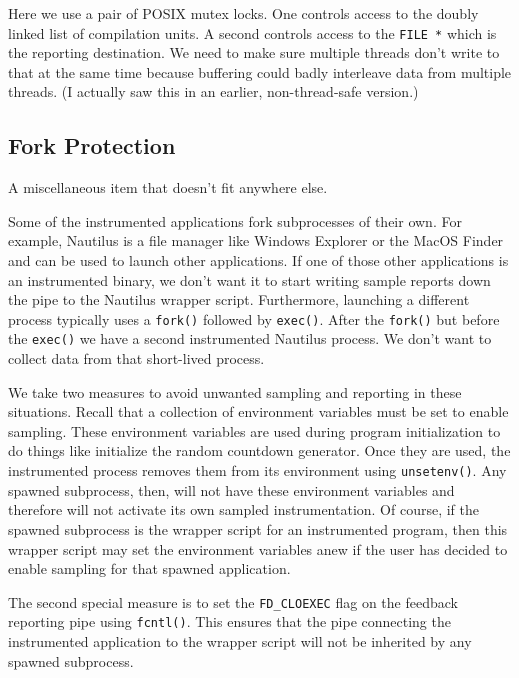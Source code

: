 \documentclass[10pt,twocolumn]{article}
\begin{document}
Here we use a pair of POSIX mutex locks.  One controls access to the
doubly linked list of compilation units.  A second controls access to
the \texttt{FILE *} which is the reporting destination.  We need to
make sure multiple threads don't write to that at the same time
because buffering could badly interleave data from multiple threads.
(I actually saw this in an earlier, non-thread-safe version.)

\subsection{Fork Protection}

A miscellaneous item that doesn't fit anywhere else.

Some of the instrumented applications fork subprocesses of their own.
For example, Nautilus is a file manager like Windows Explorer or the
MacOS Finder and can be used to launch other applications.  If one of
those other applications is an instrumented binary, we don't want it
to start writing sample reports down the pipe to the Nautilus wrapper
script.  Furthermore, launching a different process typically uses a
\texttt{fork()} followed by \texttt{exec()}.  After the
\texttt{fork()} but before the \texttt{exec()} we have a second
instrumented Nautilus process.  We don't want to collect data from
that short-lived process.

We take two measures to avoid unwanted sampling and reporting in these
situations.  Recall that a collection of environment variables must be
set to enable sampling.  These environment variables are used during
program initialization to do things like initialize the random
countdown generator.  Once they are used, the instrumented process
removes them from its environment using \texttt{unsetenv()}.  Any
spawned subprocess, then, will not have these environment variables
and therefore will not activate its own sampled instrumentation.  Of
course, if the spawned subprocess is the wrapper script for an
instrumented program, then this wrapper script may set the environment
variables anew if the user has decided to enable sampling for that
spawned application.

The second special measure is to set the \texttt{FD\_CLOEXEC} flag on
the feedback reporting pipe using \texttt{fcntl()}.  This ensures that
the pipe connecting the instrumented application to the wrapper script
will not be inherited by any spawned subprocess.
\end{document}
